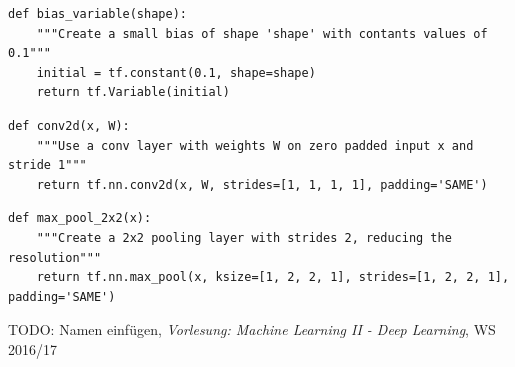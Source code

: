 \documentclass[10pt,journal,compsoc]{IEEEtran}
\begin{document}
\begin{lstlisting}[caption={Erzeugt ein bias-Array mit zufällig initialisierten Werten. Die Dimensionen werden als Parameter entegengenommen.}, label=lst2]
def bias_variable(shape):
    """Create a small bias of shape 'shape' with contants values of 0.1"""
    initial = tf.constant(0.1, shape=shape)
    return tf.Variable(initial)
\end{lstlisting}

\begin{lstlisting}[caption={Eine zweidimensionale Faltung mit Eingabe x und Filter W.}, label=lst3]
def conv2d(x, W):
    """Use a conv layer with weights W on zero padded input x and stride 1"""
    return tf.nn.conv2d(x, W, strides=[1, 1, 1, 1], padding='SAME')
\end{lstlisting}

\begin{lstlisting}[caption={Hier wird 2x2 max pooling auf die Eingabe x angewendet.}, label=lst4]
def max_pool_2x2(x):
    """Create a 2x2 pooling layer with strides 2, reducing the resolution"""
    return tf.nn.max_pool(x, ksize=[1, 2, 2, 1], strides=[1, 2, 2, 1], padding='SAME')
\end{lstlisting}

\ifCLASSOPTIONcaptionsoff
  \newpage
\fi

\begin{thebibliography}{1}
TODO: Namen einfügen, \emph{Vorlesung: Machine Learning II - Deep Learning}, WS 2016/17
\end{thebibliography}
\end{document}
